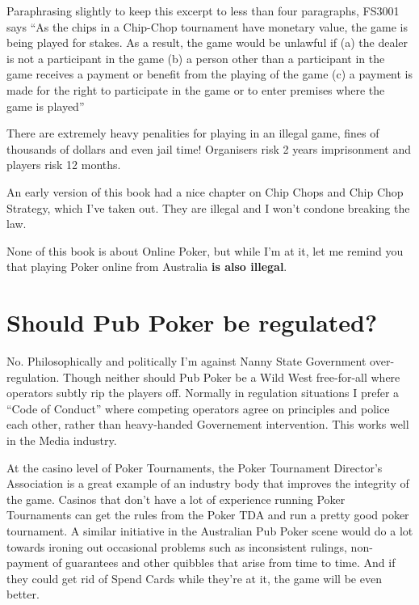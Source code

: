 Paraphrasing slightly to keep this excerpt to less than four paragraphs,
FS3001 says ``As the chips in a Chip-Chop tournament
have monetary value, the game is being played for stakes. As a result,
the game would be unlawful if (a) the dealer is not a participant in the game
(b) a person other than a participant in the game receives a payment
or benefit from the playing of the game (c) a payment is made for the
right to participate in the game or to enter premises where the game
is played''

There are extremely heavy penalities for playing in an illegal game,
fines of thousands of dollars and even jail time!
Organisers risk 2 years imprisonment and players risk 12 months.

An early version of this book had a nice chapter on Chip Chops and
Chip Chop Strategy, which I've taken out. They are illegal and I
won't condone breaking the law.

None of this book is about Online Poker, but while I'm at it,
let me remind you that playing Poker online from Australia
\textbf{is also illegal}.

\section{Should Pub Poker be regulated?}

No. Philosophically and politically I'm against Nanny State
Government over-regulation. Though neither should Pub Poker
be a Wild West free-for-all where operators subtly rip the players
off. Normally in regulation situations I prefer a ``Code of Conduct''
where competing operators agree on principles and police each other,
rather than heavy-handed Governement intervention. This works well
in the Media industry.

At the casino level of Poker Tournaments, the Poker Tournament
Director's Association is a great example of an industry body that
improves the integrity of the game. Casinos that don't have a lot of
experience running Poker Tournaments can get the rules from the Poker
TDA and run a pretty good poker tournament. A similar initiative in the
Australian Pub Poker scene would do a lot towards ironing out
occasional problems such as inconsistent rulings, non-payment of
guarantees and other quibbles that arise from time to time. And if
they could get rid of Spend Cards while they're at it, the game will
be even better.


